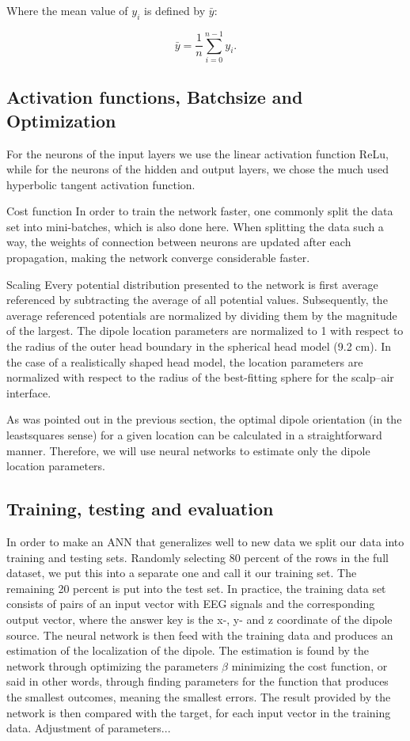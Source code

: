 \documentclass[a4paper, UKenglish, 11pt]{uiomaster}
\begin{document}
Where the mean value of $y_i$ is defined by $\bar{y}$:

\begin{equation*}
\bar{y} =  \frac{1}{n} \sum_{i=0}^{n - 1} y_i.
\label{eq:ybar}
\end{equation*}



\subsection{Activation functions, Batchsize and Optimization}
For the neurons of the input layers we use the linear activation function ReLu, while for the neurons of the hidden and output layers, we chose the much used hyperbolic tangent activation function.

Cost function
In order to train the network faster, one commonly split the data set into mini-batches, which is also done here. When splitting the data such a way, the weights of connection between neurons are updated after each propagation, making the network converge considerable faster.

Scaling
Every potential distribution presented to the network is first average referenced by subtracting the average of all potential values. Subsequently, the average referenced potentials are normalized by dividing them by the magnitude of the largest. The dipole location parameters are normalized to 1 with respect to the radius of the outer head boundary in the spherical head model (9.2 cm). In the case of a realistically shaped head model, the location parameters are normalized with respect to the radius of the best-fitting sphere for the scalp–air interface.

As was pointed out in the previous section, the optimal dipole orientation (in the leastsquares sense) for a given location can be calculated in a straightforward manner. Therefore, we will use neural networks to estimate only the dipole location parameters.


\subsection{Training, testing and evaluation}
In order to make an ANN that generalizes well to new data we split our data into training and testing sets. Randomly selecting 80 percent of the rows in the full dataset, we put this into a separate one and call it our training set. The remaining 20 percent is put into the test set. In practice, the training data set consists of pairs of an input vector with EEG signals and the corresponding output vector, where the answer key is the x-, y- and z coordinate of the dipole source. The neural network is then feed with the training data and produces an estimation of the localization of the dipole. The estimation is found by the network through optimizing the parameters $\beta$ minimizing the cost function, or said in other words, through finding parameters for the function that produces the smallest outcomes, meaning the smallest errors. The result provided by the network is then compared with the target, for each input vector in the training data. Adjustment of parameters...
\end{document}
